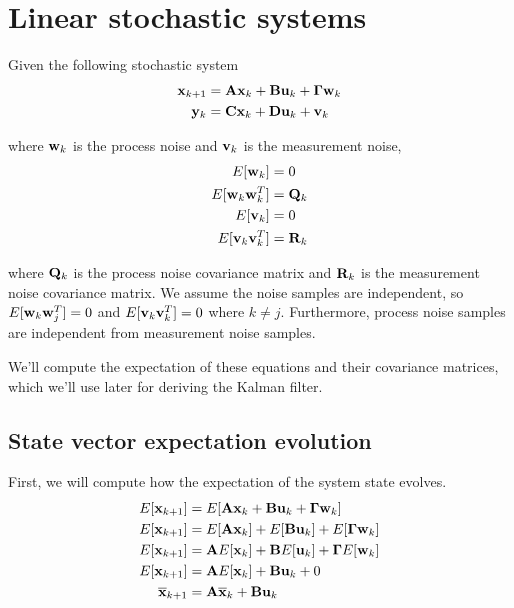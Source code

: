 \section{Linear stochastic systems}

Given the following stochastic system
\begin{align*}
  \mathbf{x}_{k+1} &= \mathbf{A}\mathbf{x}_k + \mathbf{B}\mathbf{u}_k +
    \mathbf{\Gamma}\mathbf{w}_k \\
  \mathbf{y}_k &= \mathbf{C}\mathbf{x}_k + \mathbf{D}\mathbf{u}_k + \mathbf{v}_k
\end{align*}

where $\mathbf{w}_k$ is the process noise and $\mathbf{v}_k$ is the measurement noise,
 
\begin{align*}
  E[\mathbf{w}_k] &= 0 \\
  E[\mathbf{w}_k\mathbf{w}_k^T] &= \mathbf{Q}_k \\
  E[\mathbf{v}_k] &= 0 \\
  E[\mathbf{v}_k\mathbf{v}_k^T] &= \mathbf{R}_k
\end{align*}

where $\mathbf{Q}_k$ is the process noise covariance matrix and $\mathbf{R}_k$ is the
measurement noise covariance matrix. We assume the noise samples are
independent, so $E[\mathbf{w}_k\mathbf{w}_j^T] = 0$ and $E[\mathbf{v}_k\mathbf{v}_k^T] = 0$
where $k \neq j$. Furthermore, process noise samples are independent from
measurement noise samples.

We'll compute the expectation of these equations and their covariance matrices,
which we'll use later for deriving the Kalman filter.

\subsection{State vector expectation evolution}

First, we will compute how the expectation of the \gls{system} \gls{state}
evolves.
\begin{align*}
  E[\mathbf{x}_{k+1}] &= E[\mathbf{A}\mathbf{x}_k + \mathbf{B}\mathbf{u}_k +
    \mathbf{\Gamma}\mathbf{w}_k] \\
  E[\mathbf{x}_{k+1}] &= E[\mathbf{A}\mathbf{x}_k] + E[\mathbf{B}\mathbf{u}_k] +
    E[\mathbf{\Gamma}\mathbf{w}_k] \\
  E[\mathbf{x}_{k+1}] &= \mathbf{A}E[\mathbf{x}_k] + \mathbf{B}E[\mathbf{u}_k] +
    \mathbf{\Gamma}E[\mathbf{w}_k] \\
  E[\mathbf{x}_{k+1}] &= \mathbf{A}E[\mathbf{x}_k] + \mathbf{B}\mathbf{u}_k + 0 \\
  \overline{\mathbf{x}}_{k+1} &= \mathbf{A}\overline{\mathbf{x}}_k + \mathbf{B}\mathbf{u}_k \\
\end{align*}

